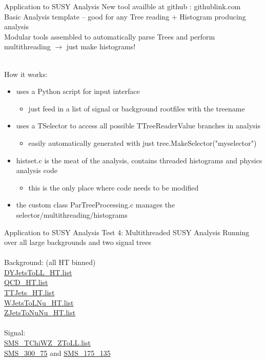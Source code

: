 \documentclass[10pt]{beamer}
\begin{document}
\begin{frame}{Application to SUSY Analysis}
New tool availble at github : githublink.com\\
Basic Analysis template -- good for any Tree reading + Histogram producing analysis\\
Modular tools assembled to automatically parse Trees and perform multithreading $\rightarrow$  just make histograms!

\quad \quad \\
How it works:
\begin{itemize}
\item uses a Python script for input interface
	\begin{itemize}
		\scriptsize
		\item just feed in a list of signal or background rootfiles with the treename 
	\end{itemize}
\item uses a TSelector to access all possible TTreeReaderValue branches in analysis
	\begin{itemize}
	\scriptsize
		\item easily automatically generated with just tree.MakeSelector("myselector")
	\end{itemize}
\item histset.c is the meat of the analysis, contains threaded histograms and physics analysis code
	\begin{itemize}
		\scriptsize
		\item this is the only place where code needs to be modified
	\end{itemize}
\item the custom class ParTreeProcessing.c manages the selector/multithreading/histograms
\end{itemize}
\end{frame}

\begin{frame}{Application to SUSY Analysis}
Test 4: Multithreaded SUSY Analysis
Running over all large backgrounds and two signal trees\\
\quad \quad \\
Background: (all HT binned)\\
\url{DYJetsToLL_HT.list}\\
\url{QCD_HT.list}  \\
\url{TTJets_HT.list} \\ 
\url{WJetsToLNu_HT.list}\\  
\url{ZJetsToNuNu_HT.list} \\

\quad \quad \\
Signal: \\
\url{SMS_TChiWZ_ZToLL.list}\\    
\url{SMS_300_75} and \url{SMS_175_135}\\

\end{frame}
\end{document}
